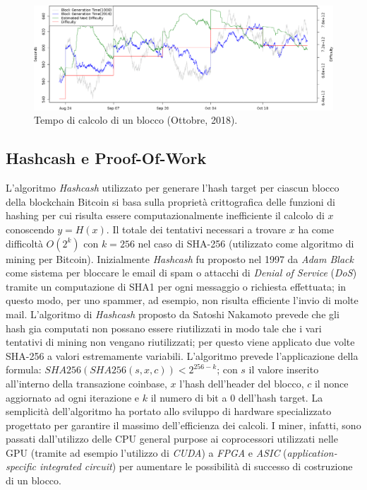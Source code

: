\begin{figure}
    \centering
    \includegraphics[width=\textwidth]{images/diffvsblock.png}
    \caption{Tempo di calcolo di un blocco (Ottobre, 2018).}
\end{figure}

\subsection{Hashcash e Proof-Of-Work}
L'algoritmo \textit{Hashcash} utilizzato per generare l'hash target per ciascun blocco della blockchain Bitcoin si basa sulla proprietà crittografica delle funzioni di hashing per cui risulta essere computazionalmente inefficiente il calcolo di $x$ conoscendo $y=H(x)$. Il totale dei tentativi necessari a trovare $x$ ha come difficoltà $O(2^k)$ con $k=256$ nel caso di SHA-256 (utilizzato come algoritmo di mining per Bitcoin).\newline
Inizialmente \textit{Hashcash} fu proposto nel 1997 da \textit{Adam Black} come sistema per bloccare le email di spam o attacchi di \textit{Denial of Service} (\textit{DoS}) tramite un computazione di SHA1 per ogni messaggio o richiesta effettuata; in questo modo, per uno spammer, ad esempio, non risulta efficiente l'invio di molte mail.\newline
L'algoritmo di \textit{Hashcash} proposto da Satoshi Nakamoto prevede che gli hash gia computati non possano essere riutilizzati in modo tale che i vari tentativi di mining non vengano riutilizzati; per questo viene applicato due volte SHA-256 a valori estremamente variabili. L'algoritmo prevede l'applicazione della formula: $SHA256(SHA256(s,x,c))<2^{256-k}$; con $s$ il valore inserito all'interno della transazione coinbase, $x$ l'hash dell'header del blocco, $c$ il nonce aggiornato ad ogni iterazione e $k$ il numero di bit a $0$ dell'hash target.\newline
La semplicità dell'algoritmo ha portato allo sviluppo di hardware specializzato progettato per garantire il massimo dell'efficienza dei calcoli. I miner, infatti, sono passati dall'utilizzo delle CPU general purpose ai coprocessori utilizzati nelle GPU (tramite ad esempio l'utilizzo di \textit{CUDA}) a \textit{FPGA} e \textit{ASIC} (\textit{application-specific integrated circuit}) per aumentare le possibilità di successo di costruzione di un blocco.\newline
